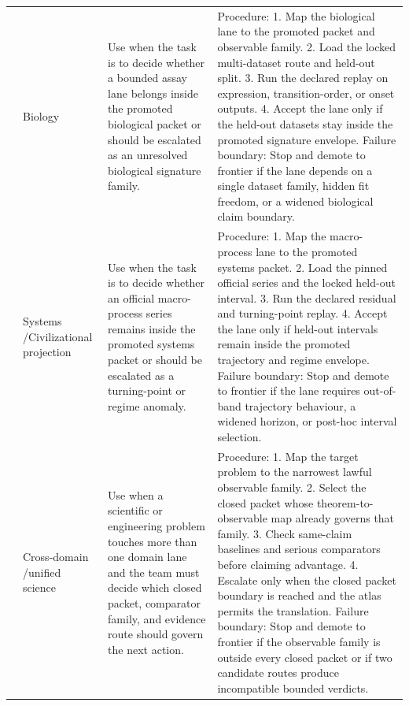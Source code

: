 \begin{longtable}{@{}L{0.15\textwidth}L{0.13\textwidth}L{0.18\textwidth}L{0.38\textwidth}@{}}
 & Biology & Use when the task is to decide whether a bounded assay lane belongs inside the promoted biological packet or should be escalated as an unresolved biological signature family. & Procedure: 1. Map the biological lane to the promoted packet and observable family. 2. Load the locked multi-dataset route and held-out split. 3. Run the declared replay on expression, transition-order, or onset outputs. 4. Accept the lane only if the held-out datasets stay inside the promoted signature envelope. \allowbreak Failure boundary: Stop and demote to frontier if the lane depends on a single dataset family, hidden fit freedom, or a widened biological claim boundary. \\
 & Systems /\allowbreak Civili\allowbreak{}zational\allowbreak{} projection & Use when the task is to decide whether an official macro-process series remains inside the promoted systems packet or should be escalated as a turning-point or regime anomaly. & Procedure: 1. Map the macro-process lane to the promoted systems packet. 2. Load the pinned official series and the locked held-out interval. 3. Run the declared residual and turning-point replay. 4. Accept the lane only if held-out intervals remain inside the promoted trajectory and regime envelope. \allowbreak Failure boundary: Stop and demote to frontier if the lane requires out-of-band trajectory behaviour, a widened horizon, or post-hoc interval selection. \\
 & Cross-domain /\allowbreak unified science & Use when a scientific or engineering problem touches more than one domain lane and the team must decide which closed packet, comparator family, and evidence route should govern the next action. & Procedure: 1. Map the target problem to the narrowest lawful observable family. 2. Select the closed packet whose theorem-to-observable map already governs that family. 3. Check same-claim baselines and serious comparators before claiming advantage. 4. Escalate only when the closed packet boundary is reached and the atlas permits the translation. \allowbreak Failure boundary: Stop and demote to frontier if the observable family is outside every closed packet or if two candidate routes produce incompatible bounded verdicts. \\
\bottomrule
\end{longtable}

